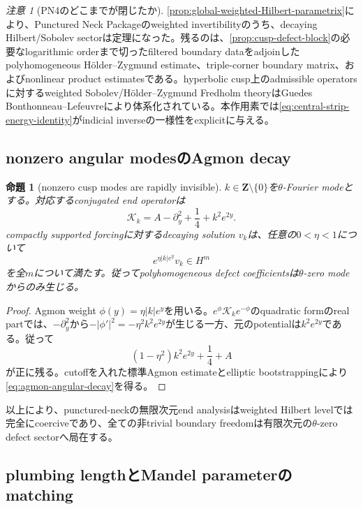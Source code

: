 \documentclass[11pt,a4paper]{ltjsarticle}
\newtheorem{proposition}[theorem]{命題}
\theoremstyle{definition}
\theoremstyle{remark}
\newtheorem{remark}[theorem]{注意}
\newcommand{\ZZ}{\mathbf Z}
\begin{document}
\begin{remark}[PN4のどこまでが閉じたか]\label{rem:PN4-progress}
\cref{prop:global-weighted-Hilbert-parametrix}により、Punctured Neck Packageのweighted invertibilityのうち、decaying Hilbert/Sobolev sectorは定理になった。残るのは、\cref{prop:cusp-defect-block}の必要なlogarithmic orderまで切ったfiltered boundary dataをadjoinしたpolyhomogeneous Hölder--Zygmund estimate、triple-corner boundary matrix、およびnonlinear product estimatesである。hyperbolic cusp上のadmissible operatorsに対するweighted Sobolev/Hölder--Zygmund Fredholm theoryはGuedes Bonthonneau--Lefeuvre\cite{GBL}により体系化されている。本作用素では\eqref{eq:central-strip-energy-identity}がindicial inverseの一様性をexplicitに与える。
\end{remark}

\subsection{nonzero angular modesのAgmon decay}
\label{subsec:angular-agmon}

\begin{proposition}[nonzero cusp modes are rapidly invisible]\label{prop:angular-agmon}
$k\in\ZZ\setminus\{0\}$を$\theta$-Fourier modeとする。対応するconjugated end operatorは
\[
 \mathcal K_k=A-\partial_y^2+\frac14+k^2e^{2y}.
\]
compactly supported forcingに対するdecaying solution $v_k$は、任意の$0<\eta<1$について
\begin{equation}\label{eq:agmon-angular-decay}
 e^{\eta|k|e^y}v_k\in H^m
\end{equation}
を全$m$について満たす。従ってpolyhomogeneous defect coefficientsは$\theta$-zero modeからのみ生じる。
\end{proposition}

\begin{proof}
Agmon weight $\phi(y)=\eta|k|e^y$を用いる。$e^\phi\mathcal K_ke^{-\phi}$のquadratic formのreal partでは、$-\partial_y^2$から$-|\phi'|^2=-\eta^2k^2e^{2y}$が生じる一方、元のpotentialは$k^2e^{2y}$である。従って
\[
 (1-\eta^2)k^2e^{2y}+\frac14+A
\]
が正に残る。cutoffを入れた標準Agmon estimateとelliptic bootstrappingにより\eqref{eq:agmon-angular-decay}を得る。
\end{proof}

以上により、punctured-neckの無限次元end analysisはweighted Hilbert levelでは完全にcoerciveであり、全ての非trivial boundary freedomは有限次元の$\theta$-zero defect sectorへ局在する。

\subsection{plumbing lengthとMandel parameterのmatching}
\end{document}
